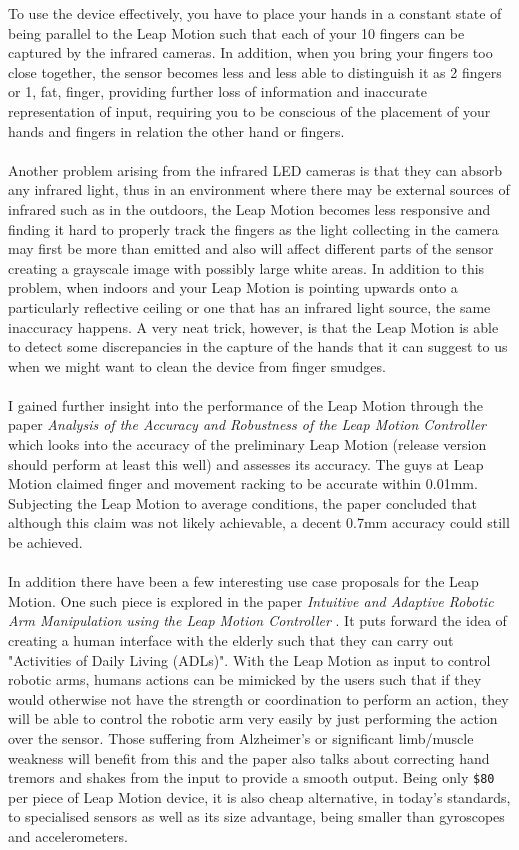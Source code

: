 \documentclass[11pt]{report}
\begin{document}
To use the device effectively, you have to place your hands in a constant 
state of being parallel to the Leap Motion such that each of your 10 fingers
can be captured by the infrared cameras. In addition, when you bring your fingers 
too close together, the sensor becomes less and less able to distinguish it 
as 2 fingers or 1, fat, finger, providing further loss of information and 
inaccurate representation of input, requiring you to be conscious of the placement
of your hands and fingers in relation the other hand or fingers.
\\ \\
Another problem arising from the infrared LED cameras is that they can absorb any
infrared light, thus in an environment where there may be external sources of 
infrared such as in the outdoors, the Leap Motion becomes less responsive and
finding it hard to properly track the fingers as the light collecting in the
camera may first be more than emitted and also will affect different parts of 
the sensor creating a grayscale image with possibly large white areas. In addition
to this problem, when indoors and your Leap Motion is pointing upwards onto a
particularly reflective ceiling or one that has an infrared light source, the same
inaccuracy happens. A very neat trick, however, is that the Leap Motion is able
to detect some discrepancies in the capture of the hands that it can suggest
to us when we might want to clean the device from finger smudges.
\\ \\
I gained further insight into the performance of the Leap Motion through the
paper \textit{Analysis of the Accuracy and Robustness of the Leap Motion 
Controller}\cite{Weichert13} which looks 
into the accuracy of the preliminary Leap Motion (release version should 
perform at least this well) and assesses its accuracy. The guys at Leap Motion 
claimed finger and movement racking to be accurate within 0.01mm. Subjecting the 
Leap Motion to average conditions, the paper concluded that although this 
claim was not likely achievable, a decent 0.7mm accuracy could still be
achieved.
\\ \\
In addition there have been a few interesting use case proposals for the
Leap Motion. One such piece is explored in the paper 
\textit{Intuitive and Adaptive Robotic Arm Manipulation using the Leap Motion Controller}
\cite{Bassily14}.
It puts forward the idea of creating a human interface with the elderly
such that they can carry out "Activities of Daily Living (ADLs)".
With the Leap Motion as input to control robotic arms, humans
actions can be mimicked by the users such that if they would otherwise not 
have the strength or coordination to perform an action, they will be able to control
the robotic arm very easily by just performing the action over the sensor. 
Those suffering from Alzheimer's or significant limb/muscle
weakness will benefit from this and the paper also talks about correcting hand
tremors and shakes from the input to provide a smooth output. 
Being only \texttt{\$80} per piece of Leap Motion device, it is 
also cheap alternative, in today's standards, to specialised sensors as well 
as its size advantage, being smaller than gyroscopes and accelerometers.  
\end{document}
